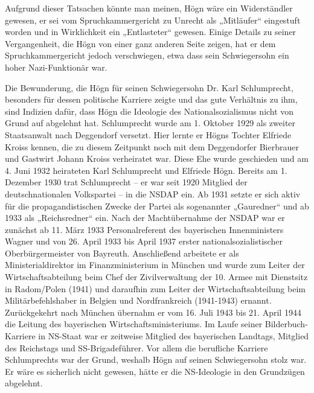 \documentclass{book}
\begin{document}
Aufgrund dieser Tatsachen könnte man meinen, Högn wäre ein
Wider\-ständler gewesen, er sei vom Spruchkammergericht zu Unrecht als
„Mitläufer“ eingestuft worden und in Wirklichkeit ein „Entlasteter“
gewesen. Einige De\-tails zu seiner Vergangenheit, die Högn von einer
ganz anderen Seite zeigen, hat er dem Spruchkammergericht jedoch
verschwiegen, etwa dass sein Schwiegersohn ein hoher Nazi-Funktionär
war.

Die Bewunderung, die Högn für seinen Schwiegersohn Dr. Karl
Schlum\-precht, besonders für dessen politische Karriere zeigte und das
gute Verhältnis zu ihm, sind Indizien dafür, dass Högn die Ideologie
des Nationalsozialismus nicht von Grund auf abgelehnt hat. Schlumprecht
wurde am 1. Oktober 1929 als zweiter Staatsanwalt nach Deggendorf
versetzt. Hier lernte er Högns Tochter Elfriede Kroiss kennen, die zu
diesem Zeitpunkt noch mit dem Deggendorfer Bierbrauer und Gastwirt
Johann Kroiss verheiratet war. Diese Ehe wurde geschieden und am 4.
Juni 1932 heirateten Karl Schlumprecht und Elfriede Högn. Bereits am 1.
Dezember 1930 trat Schlumprecht – er war seit 1920 Mitglied der
deutschnationalen Volkspartei – in die NSDAP ein. Ab 1931 setzte er
sich aktiv für die propagandistischen Zwecke der Partei als
so\-genannter „Gauredner“ und ab 1933 als „Reichsredner“ ein. Nach der
Macht\-übernahme der NSDAP war er zunächst ab 11. März 1933
Personalreferent des bayerischen Innenministers Wagner und von 26.
April 1933 bis April 1937 erster nationalsozialistischer
Oberbürgermeister von Bayreuth. Anschließend arbeitete er als
Ministerialdirektor im Finanzministerium in München und wurde zum
Leiter der Wirtschaftsabteilung beim Chef der Zivilverwaltung der 10.
Armee mit Dienstsitz in Radom/Polen (1941) und daraufhin zum Leiter der
Wirtschaftsabteilung beim Militärbefehlshaber in Belgien und
Nordfrank\-reich (1941-1943) ernannt. Zurückgekehrt nach München
übernahm er vom 16. Juli 1943 bis 21. April 1944 die Leitung des
bayerischen Wirtschaftsmini\-steriums. Im Laufe seiner
Bilderbuch-Karriere in NS-Staat war er zeitweise Mitglied des
bayerischen Landtags, Mitglied des Reichstags und SS-Brigade\-führer.
Vor allem die berufliche Karriere Schlumprechts war der Grund,
wes\-halb Högn auf seinen Schwiegersohn stolz war. Er wäre es
sicherlich nicht gewesen, hätte er die NS-Ideologie in den Grundzügen
abgelehnt.

\end{document}
